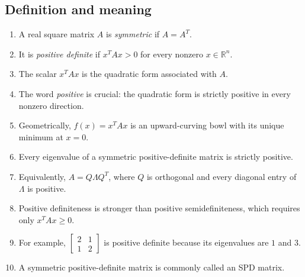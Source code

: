 \documentclass[11pt]{article}
\begin{document}
\subsection{Definition and meaning}
\begin{enumerate}
  \item A real square matrix $A$ is \emph{symmetric} if $A=A^T$.
  \item It is \emph{positive definite} if $x^TAx>0$ for every nonzero $x\in\mathbb{R}^n$.
  \item The scalar $x^TAx$ is the quadratic form associated with $A$.
  \item The word \emph{positive} is crucial: the quadratic form is strictly positive in every nonzero direction.
  \item Geometrically, $f(x)=x^TAx$ is an upward-curving bowl with its unique minimum at $x=0$.
  \item Every eigenvalue of a symmetric positive-definite matrix is strictly positive.
  \item Equivalently, $A=Q\Lambda Q^T$, where $Q$ is orthogonal and every diagonal entry of $\Lambda$ is positive.
  \item Positive definiteness is stronger than positive semidefiniteness, which requires only $x^TAx\geq 0$.
  \item For example, $\begin{bmatrix}2&1\\1&2\end{bmatrix}$ is positive definite because its eigenvalues are $1$ and $3$.
  \item A symmetric positive-definite matrix is commonly called an SPD matrix.
\end{enumerate}
\end{document}
